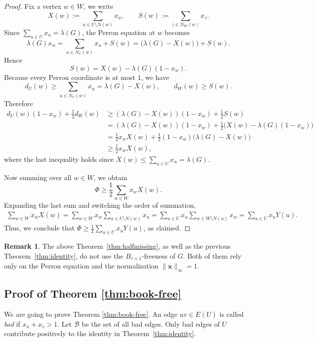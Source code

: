 \documentclass[11pt,a4paper]{article}
\theoremstyle{definition}
\newtheorem{remark}{Remark}
\theoremstyle{plain}
\renewcommand{\le}{\leqslant}
\renewcommand{\ge}{\geqslant}
\begin{document}
\begin{proof}
Fix a vertex $w\in W$, we write
\[ X(w):=\sum_{u\in U\setminus N(w)}x_u,\qquad 
S(w):=\sum_{z\in N_W(w)}x_z.
\]
Since $\sum_{u\in U}x_u=\lambda(G)$, the Perron equation at $w$ becomes
\[
\lambda(G)x_w=\sum_{u\in N_U(w)}x_u+S(w)=\bigl(\lambda(G)-X(w)\bigr)+S(w).
\]
Hence
\[
S(w)=X(w)-\lambda(G)(1-x_w).
\]
Because every Perron coordinate is at most $1$, we have
\[
d_U(w)\ge \sum_{u\in N_U(w)}x_u=\lambda(G)-X(w),
\qquad
 d_W(w)\ge S(w).
\]
Therefore
\begin{align*}
d_U(w)(1-x_w)+\frac12 d_W(w) 
&\ge (\lambda(G)-X(w))(1-x_w)+\frac12 S(w)\\
&=(\lambda(G)-X(w))(1-x_w)+\frac12\bigl(X(w)-\lambda(G)(1-x_w)\bigr)\\
&=\frac12 x_wX(w)+\frac12(1-x_w)\bigl(\lambda(G)-X(w)\bigr)\\
&\ge \frac12 x_wX(w),
\end{align*}
where the last inequality holds since $X(w)\le \sum_{u\in U}x_u=\lambda(G)$.

Now summing over all $w\in W$, we obtain 
\[
\Phi \ge \frac12\sum_{w\in W}x_wX(w).
\]
Expanding the last sum and switching the order of summation,
\begin{align*}
\sum_{w\in W}x_wX(w)
=\sum_{w\in W}x_w\sum_{u\in U\setminus N(w)}x_u 
=\sum_{u\in U}x_u\sum_{w\in W\setminus N(u)}x_w =\sum_{u\in U}x_uY(u).
\end{align*} 
Thus, we conclude that 
$\Phi\ge \frac12\sum_{u\in U}x_uY(u)$, 
as claimed.
\end{proof}

\begin{remark}
    The above Theorem~\ref{thm:halfmissing}, as well as the previous Theorem~\ref{thm:identity}, do not use the $B_{r+1}$-freeness of $G$. Both of them rely
only on the Perron equation and the normalization $\|\bm{x}\|_{\infty} =1$.  
\end{remark}



\subsection{Proof of Theorem \ref{thm:book-free}}


We are going to prove Theorem \ref{thm:book-free}. 
An edge $uv\in E(U)$ is called \emph{bad} if
$x_u+x_v>1$. Let $\mathcal{B}$ be the set of all bad edges. 
Only bad edges of $U$ contribute positively to the identity in Theorem~\ref{thm:identity}. 
\end{document}
